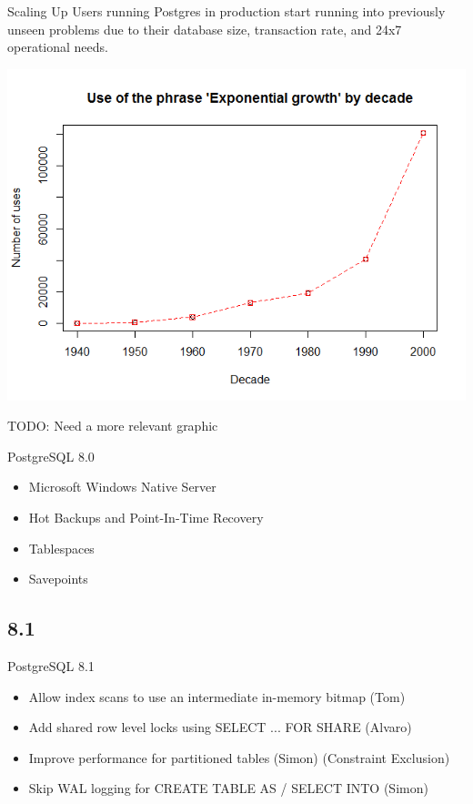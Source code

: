\documentclass[t,10pt]{beamer}
\begin{document}
\begin{frame}{Scaling Up}
  Users running Postgres in production start running into previously
  unseen problems due to their database size, transaction rate, and
  24x7 operational needs.

  \includegraphics[width=\textwidth,keepaspectratio=true]{assets/exponential-growth.png}

  TODO: Need a more relevant graphic
\end{frame}

\begin{frame}{PostgreSQL 8.0}
  \begin{itemize}%
  \item Microsoft Windows Native Server
  \item \alert<2>{Hot Backups and Point-In-Time Recovery}
  \item Tablespaces
  \item Savepoints
  \end{itemize}
\end{frame}

\subsection{8.1}
\begin{frame}{PostgreSQL 8.1}
  \begin{itemize}%
  \item Allow index scans to use an intermediate in-memory bitmap (Tom)
  \item Add shared row level locks using SELECT ... FOR SHARE (Alvaro)
  \item Improve performance for partitioned tables (Simon) (Constraint Exclusion)
  \item Skip WAL logging for CREATE TABLE AS / SELECT INTO (Simon)
  \end{itemize}
\end{frame}
\end{document}

